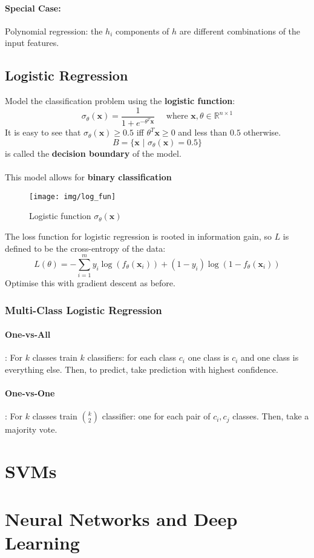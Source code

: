 \documentclass{article}
\renewcommand{\vec}[1]{\mathbf{#1}}
\newcommand{\Reals}{\mathbb{R}}
\begin{document}
\paragraph{Special Case:} Polynomial regression: the $h_i$ components of $h$ are
different combinations of the input features.
\subsection{Logistic Regression}
Model the classification problem using the \textbf{logistic function}:
\[
  \sigma_{\theta}(\vec{x}) = \frac{1}{1 + e^{-\theta^T\vec{x}}}\quad\text{ where
  } \vec{x}, \theta \in \Reals^{n \times 1}
\]
It is easy to see that $\sigma_\theta(\vec{x}) \geq 0.5$ iff $\theta^T\vec{x}
\geq 0$ and less than $0.5$ otherwise.
\[
  B = \{\vec{x} \,\,|\,\, \sigma_\theta(\vec{x}) = 0.5 \}
\]
is called the \textbf{decision boundary} of the model.
\paragraph{}
This model allows for \textbf{binary classification}
\begin{figure}[H]
  \centering
  \texttt{[image: img/log\_fun]}
  \caption{Logistic function $\sigma_{\theta}(\vec{x})$}
\end{figure}
The loss function for logistic regression is rooted in information gain, so $L$
is defined to be the cross-entropy of the data:
\[
  L(\theta) = -\sum_{i = 1}^m y_i\log (f_\theta(\vec{x}_i)) + (1 - y_i)\log(1 - f_\theta(\vec{x}_i))
\]
Optimise this with gradient descent as before.
\subsubsection{Multi-Class Logistic Regression}
\paragraph{One-vs-All}: For $k$ classes train $k$ classifiers: for each class
$c_i$ one class is $c_i$ and one class is everything else. Then, to predict,
take prediction with highest confidence.
\paragraph{One-vs-One}: For $k$ classes train $\binom{k}{2}$ classifier: one for
each pair of $c_i, c_j$ classes. Then, take a majority vote.
\section{SVMs}

\section{Neural Networks and Deep Learning}
\end{document}
